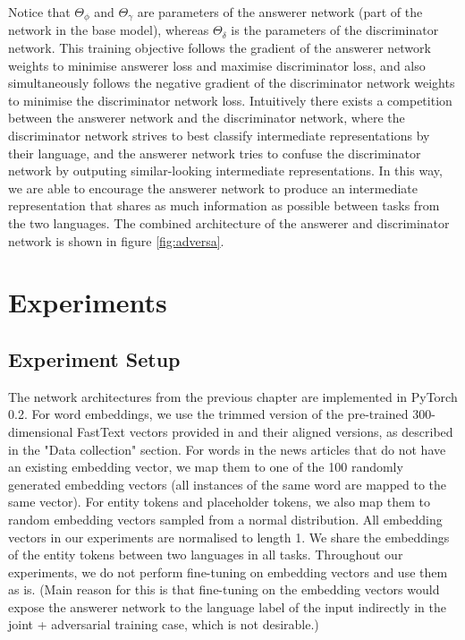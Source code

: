 \documentclass[]{article}
\begin{document}
Notice that $\Theta_\phi$ and $\Theta_\gamma$ are parameters of the answerer network (part of the network in the base model), whereas $\Theta_\delta$ is the parameters of the discriminator network. This training objective follows the gradient of the answerer network weights to minimise answerer loss and maximise discriminator loss, and also simultaneously follows the negative gradient of the discriminator network weights to minimise the discriminator network loss. Intuitively there exists a competition between the answerer network and the discriminator network, where the discriminator network strives to best classify intermediate representations by their language, and the answerer network tries to confuse the discriminator network by outputing similar-looking intermediate representations. In this way, we are able to encourage the answerer network to produce an intermediate representation that shares as much information as possible between tasks from the two languages. The combined architecture of the answerer and discriminator network is shown in figure \ref{fig:adversa}.

\section{Experiments}

\subsection{Experiment Setup}

The network architectures from the previous chapter are implemented in PyTorch 0.2. For word embeddings, we use the trimmed version of the pre-trained 300-dimensional FastText vectors provided in \cite{bojanowski2016enriching} and their aligned versions, as described in the "Data collection" section. For words in the news articles that do not have an existing embedding vector, we map them to one of the 100 randomly generated embedding vectors (all instances of the same word are mapped to the same vector). For entity tokens and placeholder tokens, we also map them to random embedding vectors sampled from a normal distribution. All embedding vectors in our experiments are normalised to length 1. We share the embeddings of the entity tokens between two languages in all tasks. Throughout our experiments, we do not perform fine-tuning on embedding vectors and use them as is. (Main reason for this is that fine-tuning on the embedding vectors would expose the answerer network to the language label of the input indirectly in the joint + adversarial training case, which is not desirable.)
\end{document}
